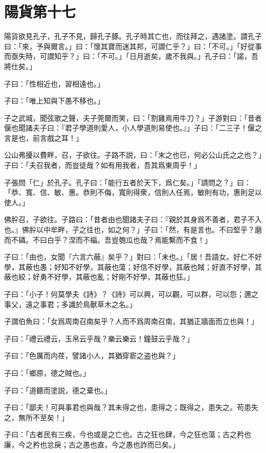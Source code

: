 \section[陽貨第十七]{陽貨第十七}

陽貨欲見孔子，孔子不見，歸孔子豚。孔子時其亡也，而往拜之，遇諸塗。謂孔子曰：「來，予與爾言。」曰：「懷其寶而迷其邦，可謂仁乎？」曰：「不可。」「好從事而亟失時，可謂知乎？」曰：「不可。」「日月逝矣，歲不我與。」孔子曰：「諾，吾將仕矣。」

子曰：「性相近也，習相遠也。」

子曰：「唯上知與下愚不移也。」

子之武城，聞弦歌之聲，夫子莞爾而笑，曰：「割雞焉用牛刀？」子游對曰：「昔者偃也聞諸夫子曰：『君子學道則愛人，小人學道則易使也。』」子曰：「二三子！偃之言是也，前言戲之耳！」

公山弗擾以費畔，召，子欲往。子路不説，曰：「末之也已，何必公山氏之之也？」子曰：「夫召我者，而豈徒哉？如有用我者，吾其爲東周乎！」

子張問「仁」於孔子。孔子曰：「能行五者於天下，爲仁矣。」「請問之？」曰：「恭、寬、信、敏、惠。恭則不侮，寬則得衆，信則人任焉，敏則有功，惠則足以使人。」

佛肸召，子欲往。子路曰：「昔者由也聞諸夫子曰：『親於其身爲不善者，君子不入也。』佛肸以中牟畔，子之往也，如之何？」子曰：「然，有是言也。不曰堅乎？磨而不磷。不曰白乎？涅而不緇。吾豈匏瓜也哉？焉能繫而不食！」

子曰：「由也，女聞『六言六蔽』矣乎？」對曰：「未也。」「居！吾語女。好仁不好學，其蔽也愚；好知不好學，其蔽也蕩；好信不好學，其蔽也賊；好直不好學，其蔽也絞；好勇不好學，其蔽也亂；好剛不好學，其蔽也狂。」

子曰：「小子！何莫學夫《詩》？《詩》可以興，可以觀，可以群，可以怨；邇之事父，遠之事君；多識於鳥獸草木之名。」

子謂伯魚曰：「女爲周南召南矣乎？人而不爲周南召南，其猶正牆面而立也與！」

子曰：「禮云禮云，玉帛云乎哉？樂云樂云！鐘鼓云乎哉？」

子曰：「色厲而内荏，譬諸小人，其猶穿窬之盗也與？」

子曰：「鄉原，德之賊也。」

子曰：「道聽而塗説，德之棄也。」

子曰：「鄙夫！可與事君也與哉？其未得之也，患得之；既得之，患失之。苟患失之，無所不至矣！」

子曰：「古者民有三疾，今也或是之亡也。古之狂也肆，今之狂也蕩；古之矜也廉，今之矜也忿戾；古之愚也直，今之愚也詐而已矣。」

